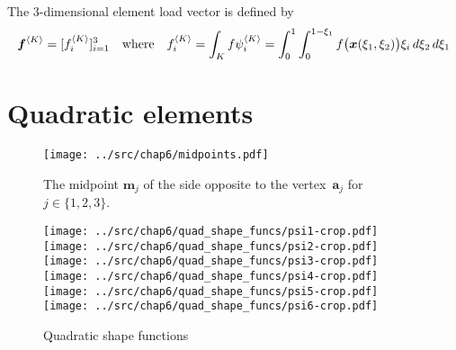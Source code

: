 The 3-dimensional element load vector is defined by
\[
\boldsymbol{f}^{\langle K\rangle}=[f^{\langle K\rangle}_i]_{i=1}^3
\quad\text{where}\quad
f^{\langle K\rangle}_i=\int_K f\psi^{\langle K\rangle}_i
	=\int_0^1\int_0^{1-\xi_1}f\bigl(\boldsymbol{x}(\xi_1,\xi_2)\bigr)\xi_i
	\,d\xi_2 \,d\xi_1
\]

\section{Quadratic elements}

\begin{figure}
\caption{The midpoint $\boldsymbol{m}_j$ of the side opposite to the 
vertex~$\boldsymbol{a}_j$ for $j\in\{1,2,3\}$.}
\label{fig: midpoints}
\begin{center}
\texttt{[image: ../src/chap6/midpoints.pdf]}
\end{center}
\end{figure}

\begin{figure}
\caption{Quadratic shape functions}
\label{fig: quad shape funcs}
\hfil
\texttt{[image: ../src/chap6/quad\_shape\_funcs/psi1-crop.pdf]}
\hfil
\texttt{[image: ../src/chap6/quad\_shape\_funcs/psi2-crop.pdf]}
\hfil
\texttt{[image: ../src/chap6/quad\_shape\_funcs/psi3-crop.pdf]}
\hfil
\\[2\jot]
\texttt{[image: ../src/chap6/quad\_shape\_funcs/psi4-crop.pdf]}
\hfil
\texttt{[image: ../src/chap6/quad\_shape\_funcs/psi5-crop.pdf]}
\hfil
\texttt{[image: ../src/chap6/quad\_shape\_funcs/psi6-crop.pdf]}
\hfil
\end{figure}


